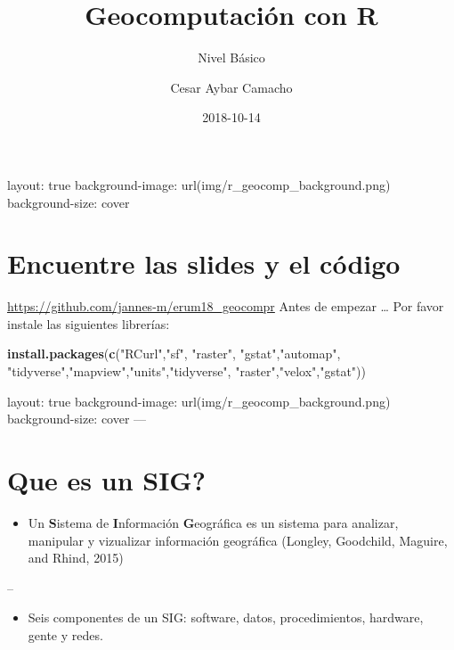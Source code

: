 \documentclass[]{article}
\title{Geocomputación con R}
\subtitle{Nivel Básico}
\author{Cesar Aybar Camacho}
\date{2018-10-14}
\newenvironment{Shaded}{\begin{snugshade}}{\end{snugshade}}
\newcommand{\KeywordTok}[1]{\textcolor[rgb]{0.13,0.29,0.53}{\textbf{#1}}}
\newcommand{\StringTok}[1]{\textcolor[rgb]{0.31,0.60,0.02}{#1}}
\newcommand{\NormalTok}[1]{#1}
\providecommand{\tightlist}{%
  \setlength{\itemsep}{0pt}\setlength{\parskip}{0pt}}
\begin{document}
\maketitle

layout: true background-image: url(img/r\_geocomp\_background.png)
background-size: cover

\section{Encuentre las slides y el
código}\label{encuentre-las-slides-y-el-codigo}

 \url{https://github.com/jannes-m/erum18_geocompr} Antes de empezar
\ldots{} Por favor instale las siguientes librerías:

\begin{Shaded}
\begin{Highlighting}[]
\KeywordTok{install.packages}\NormalTok{(}\KeywordTok{c}\NormalTok{(}\StringTok{"RCurl"}\NormalTok{,}\StringTok{"sf"}\NormalTok{, }\StringTok{"raster"}\NormalTok{, }\StringTok{"gstat"}\NormalTok{,}\StringTok{"automap"}\NormalTok{,}
                   \StringTok{"tidyverse"}\NormalTok{,}\StringTok{"mapview"}\NormalTok{,}\StringTok{"units"}\NormalTok{,}\StringTok{"tidyverse"}\NormalTok{,}
                   \StringTok{"raster"}\NormalTok{,}\StringTok{"velox"}\NormalTok{,}\StringTok{"gstat"}\NormalTok{))}
\end{Highlighting}
\end{Shaded}

layout: true background-image: url(img/r\_geocomp\_background.png)
background-size: cover ---

\section{Que es un SIG?}\label{que-es-un-sig}

\begin{itemize}
\tightlist
\item
  Un \textbf{S}istema de \textbf{I}nformación \textbf{G}eográfica es un
  sistema para analizar, manipular y vizualizar información geográfica
  (Longley, Goodchild, Maguire, and Rhind, 2015)
\end{itemize}

--

\begin{itemize}
\tightlist
\item
  Seis componentes de un SIG: software, datos, procedimientos, hardware,
  gente y redes.
\end{itemize}
\end{document}
